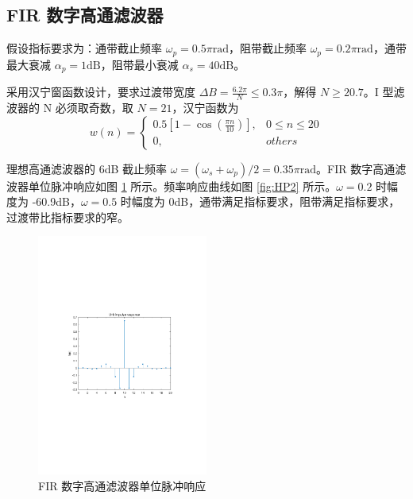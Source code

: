 \documentclass[12pt,AutoFakeBold]{article}
\begin{document}
\subsection{FIR 数字高通滤波器}

假设指标要求为：通带截止频率 $\omega_p=0.5\pi\mathrm{rad}$，阻带截止频率 $\omega_p=0.2\pi\mathrm{rad}$，通带最大衰减 $\alpha_p=1\mathrm{dB}$，阻带最小衰减 $\alpha_s=40\mathrm{dB}$。

采用汉宁窗函数设计，要求过渡带宽度 $\Delta B=\frac{6.2\pi}{N}\le 0.3\pi$，解得 $N\ge20.7$。I 型滤波器的 N 必须取奇数，取 $N=21$，汉宁函数为
%
\begin{equation*}
w(n)=\begin{cases}
0.5\left[ 1 - \cos\left(\frac{\pi n}{10}\right) \right], & 0\le n\le 20 \\
0, & others
\end{cases}
\end{equation*}
%

理想高通滤波器的 6dB 截止频率 $\omega=(\omega_s+\omega_p)/2=0.35\pi\mathrm{rad}$。FIR 数字高通滤波器单位脉冲响应如图 \ref{fig:HP1} 所示。频率响应曲线如图 \ref{fig:HP2} 所示。$\omega=0.2$ 时幅度为 -60.9dB，$\omega=0.5$ 时幅度为 0dB，通带满足指标要求，阻带满足指标要求，过渡带比指标要求的窄。

\begin{figure}[htbp]
	\centering
	\includegraphics[width=0.5\textwidth]{figure/HP1.pdf}
	\caption{FIR 数字高通滤波器单位脉冲响应} \label{fig:HP1}
\end{figure}
\end{document}
